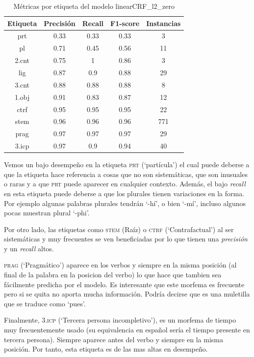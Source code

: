 \documentclass[letterpaper,12pt,oneside]{book}
\theoremstyle{definition}
\begin{document}
\begin{table}[ht]
    \centering
    \begin{tabular}{| c | c | c | c | c |}\hline
        \textbf{Etiqueta} & \textbf{Precisión} & \textbf{Recall} & \textbf{F1-score} & \textbf{Instancias} \\\hline
        prt & 0.33 & 0.33 & 0.33 & 3\\
        pl & 0.71 & 0.45 & 0.56 & 11\\
        2.cnt & 0.75 & 1 & 0.86 & 3\\
        lig & 0.87 & 0.9 & 0.88 & 29\\
        3.cnt & 0.88 & 0.88 & 0.88 & 8\\
        1.obj & 0.91 & 0.83 & 0.87 & 12\\
        ctrf & 0.95 & 0.95 & 0.95 & 22\\
        stem & 0.96 & 0.96 & 0.96 & 771\\
        prag & 0.97 & 0.97 & 0.97 & 29\\
        3.icp & 0.97 & 0.9 & 0.94 & 40\\\hline
    \end{tabular}
    \caption{Métricas por etiqueta del modelo \textsf{linearCRF\_l2\_zero}}
    \label{tab:tags-linearcrf}
\end{table}

Vemos un bajo desempeño en la etiqueta \textsc{prt} (`partícula') el cual puede deberse a que la etiqueta hace referencia a cosas que no son sistemáticas, que son inusuales o raras y a que \textsc{prt} puede aparecer en cualquier contexto. Además, el bajo \textit{recall} en esta etiqueta puede deberse a que los plurales tienen variaciones en la forma. Por ejemplo algunas palabras plurales tendrán `-hí', o bien `-mí', incluso algunos pocas muestran plural `-phi'.

Por otro lado, las etiquetas como \textsc{stem} (Raíz) o \textsc{ctrf} (`Contrafactual') al ser sistemáticas y muy frecuentes se ven beneficiadas por lo que tienen una \textit{precisión} y un \textit{recall} altos. 

\textsc{prag} (`Pragmático') aparece en los verbos y siempre en la misma posición (al final de la palabra en la posicion del verbo) lo que hace que tambien sea fácilmente predicha por el modelo. Es interesante que este morfema es frecuente pero si se quita no aporta mucha información. Podría decirse que es una muletilla que se traduce como `pues'.

Finalmente, \textsc{3.icp} (`Tercera persona incompletivo'), es un morfema de tiempo muy frecuentemente usado (su equivalencia en español sería el tiempo presente en tercera persona). Siempre aparece antes del verbo y siempre en la misma posición. Por tanto, esta etiqueta es de las mas altas en desempeño.
\end{document}
